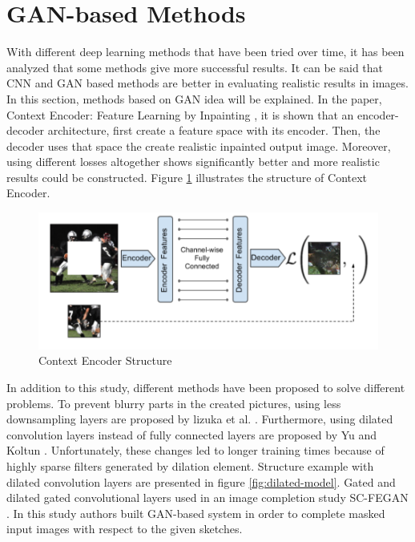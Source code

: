 \section{GAN-based Methods}

With different deep learning methods that have been tried over time, it has been analyzed that some methods give more successful results. It can be said that CNN and GAN based methods are better in evaluating realistic results in images. In this section, methods based on GAN idea will be explained. \newline
In the paper, Context Encoder: Feature Learning by Inpainting \cite{context_encoders}, it is shown that an encoder-decoder architecture, first create a feature space with its encoder. Then, the decoder uses that space the create realistic inpainted output image. Moreover, using different losses altogether shows significantly better and more realistic results could be constructed. Figure \ref{fig:context-encoder} illustrates the structure of Context Encoder.

\begin{figure}[h!]
    \centering
    \includegraphics[scale=0.5]{figures/chapter4/context-encoder-example.png}
    \caption{Context Encoder Structure \cite{context_encoders}}
    \label{fig:context-encoder}
\end{figure}

In addition to this study, different methods have been proposed to solve different problems. To prevent blurry parts in the created pictures, using less downsampling layers are proposed by lizuka et al. \cite{Iizuka2017}. Furthermore, using dilated convolution layers instead of fully connected layers are proposed by Yu and Koltun \cite{dilated_conv}. Unfortunately, these changes led to longer training times because of highly sparse filters generated by dilation element. Structure example with dilated convolution layers are presented in figure \ref{fig:dilated-model}. Gated and dilated gated convolutional layers used in an image completion study SC-FEGAN \cite{scfegan}. In this study authors built GAN-based system in order to complete masked input images with respect to the given sketches.

